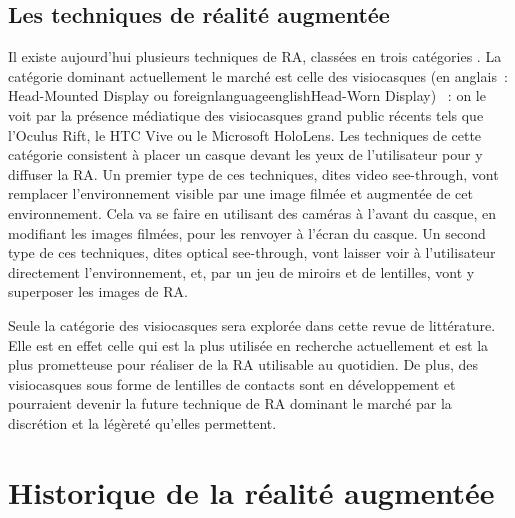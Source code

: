 \subsection*{Les techniques de réalité augmentée}

Il existe aujourd'hui plusieurs techniques de RA, classées en trois catégories . La catégorie dominant actuellement le marché est celle des visiocasques (en anglais~: \foreignlanguage{english}{Head-Mounted Display} ou foreignlanguage{english}{Head-Worn Display}) \citep{VanKrevelenPoelman2010}~: on le voit par la présence médiatique des visiocasques grand public récents tels que l'Oculus Rift, le HTC Vive ou le Microsoft HoloLens. Les techniques de cette catégorie consistent à placer un casque devant les yeux de l'utilisateur pour y diffuser la RA. Un premier type de ces techniques, dites \foreignlanguage{english}{video see-through}, vont remplacer l'environnement visible par une image filmée et augmentée de cet environnement. Cela va se faire en utilisant des caméras à l'avant du casque, en modifiant les images filmées, pour les renvoyer à l'écran du casque. Un second type de ces techniques, dites \foreignlanguage{english}{optical see-through}, vont laisser voir à l'utilisateur directement l'environnement, et, par un jeu de miroirs et de lentilles, vont y superposer les images de RA.


Seule la catégorie des visiocasques sera explorée dans cette revue de littérature. Elle est en effet celle qui est la plus utilisée en recherche actuellement et est la plus prometteuse pour réaliser de la RA utilisable au quotidien. \cite{CarmignianiFurhtAnisettiEtAl2011} De plus, des visiocasques sous forme de lentilles de contacts sont en développement et pourraient devenir la future technique de RA dominant le marché par la discrétion et la légèreté qu'elles permettent. \citep{VanKrevelenPoelman2010}



\section*{Historique de la réalité augmentée}
